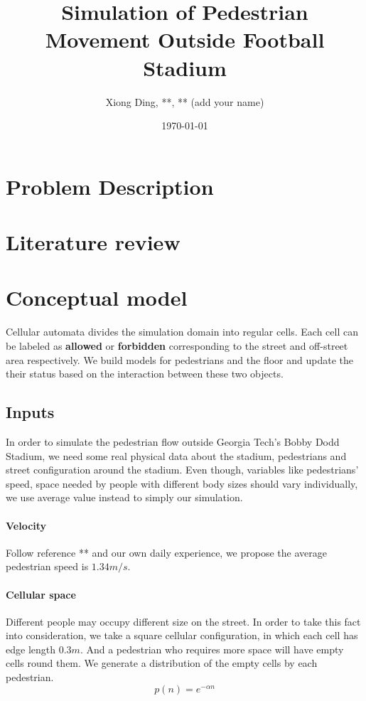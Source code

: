 \documentclass[paper=a4, fontsize=11pt]{article} %
\title{	Simulation of Pedestrian Movement Outside Football Stadium}
\author{Xiong Ding, **, ** (add your name)} %
\date{\today} %
\begin{document}
\maketitle %

\section{Problem Description}

\section{Literature review}

\section{Conceptual model}
Cellular automata divides the simulation domain into regular cells.
Each cell can be labeled as \textbf{allowed} or \textbf{forbidden} 
corresponding to the street and off-street area respectively. We 
build models for pedestrians and the floor and update the their
status based on the interaction between these two objects.

\subsection{Inputs}

In order to simulate the pedestrian flow outside Georgia Tech's Bobby Dodd Stadium,
we need some real physical data about the stadium, pedestrians and street configuration
around the stadium. Even though, variables like pedestrians' speed, 
space needed by people with different body sizes should vary individually, we use 
average value instead to simply our simulation.

\paragraph{Velocity} Follow reference ** and our own daily experience, we propose the
average pedestrian speed is $1.34 m/s$. 

\paragraph{Cellular space} Different people may occupy different size on the 
street. In order to take this fact into consideration, we take a square cellular 
configuration, in which each cell has edge length $0.3m$. And a pedestrian
who requires more space will have empty cells round them. We generate a distribution 
of the empty cells by each pedestrian.
\begin{equation}
  \label{eq:1}
  p(n) = e^{-\alpha n}
\end{equation}
\end{document}
